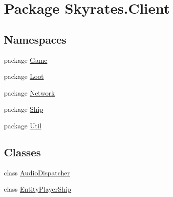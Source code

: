 \hypertarget{namespace_skyrates_1_1_client}{\section{Package Skyrates.\-Client}
\label{namespace_skyrates_1_1_client}
}
\subsection*{Namespaces}
\begin{DoxyCompactItemize}
\item 
package \hyperlink{namespace_skyrates_1_1_client_1_1_game}{Game}
\item 
package \hyperlink{namespace_skyrates_1_1_client_1_1_loot}{Loot}
\item 
package \hyperlink{namespace_skyrates_1_1_client_1_1_network}{Network}
\item 
package \hyperlink{namespace_skyrates_1_1_client_1_1_ship}{Ship}
\item 
package \hyperlink{namespace_skyrates_1_1_client_1_1_util}{Util}
\end{DoxyCompactItemize}
\subsection*{Classes}
\begin{DoxyCompactItemize}
\item 
class \hyperlink{class_skyrates_1_1_client_1_1_audio_dispatcher}{Audio\-Dispatcher}
\item 
class \hyperlink{class_skyrates_1_1_client_1_1_entity_player_ship}{Entity\-Player\-Ship}
\end{DoxyCompactItemize}
